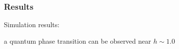 \documentclass{beamer}
\begin{document}
\begin{frame}
	\frametitle{Results}
	\setcounter{subfigure}{0}
	Simulation results:
	\begin{figure}[H]
		\centering
		\subfigbottomskip=2pt
		\subfigcapskip=-5pt
	\end{figure}
	a quantum phase transition can be observed near $h\sim 1.0$
\end{frame}
\end{document}
